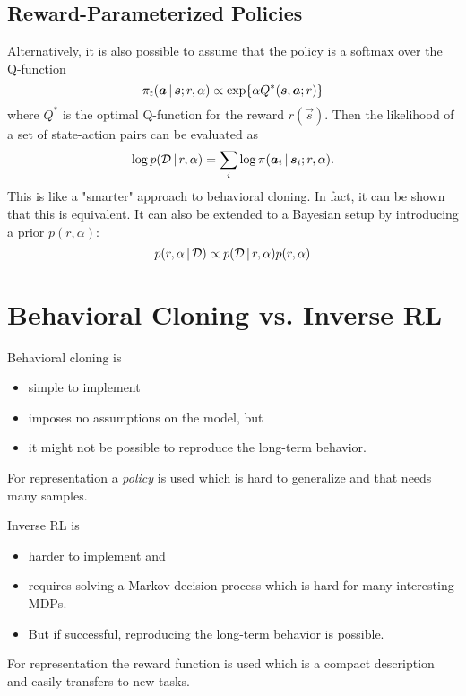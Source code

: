 		\subsection{Reward-Parameterized Policies}
			Alternatively, it is also possible to assume that the policy is a softmax over the Q-function
			\begin{equation*}
				\pi_t(\bm{a} \,\vert\, \bm{s}; r, \alpha) \propto \exp{ \alpha Q^\ast(\bm{s}, \bm{a}; r) }
			\end{equation*}
			where \(Q^\ast\) is the optimal Q-function for the reward \(r(\vec{s})\). Then the likelihood of a set of state-action pairs can be evaluated as
			\begin{equation*}
				\log p(\mathcal{D} \,\vert\, r, \alpha) = \sum_i \log \pi(\bm{a}_i \,\vert\, \bm{s}_i; r, \alpha).
			\end{equation*}
			This is like a "smarter" approach to behavioral cloning. In fact, it can be shown that this is equivalent. It can also be extended to a Bayesian setup by introducing a prior \( p(r, \alpha) \):
			\begin{equation*}
				p(r, \alpha \,\vert\, \mathcal{D}) \propto p(\mathcal{D} \,\vert\, r, \alpha) p(r, \alpha)
			\end{equation*}

	\section{Behavioral Cloning vs. Inverse RL}
		Behavioral cloning is
		\begin{itemize}
			\item simple to implement
			\item imposes no assumptions on the model, but
			\item it might not be possible to reproduce the long-term behavior.
		\end{itemize}
		For representation a \emph{policy} is used which is hard to generalize and that needs many samples.

		Inverse RL is
		\begin{itemize}
			\item harder to implement and
			\item requires solving a Markov decision process which is hard for many interesting MDPs.
			\item But if successful, reproducing the long-term behavior is possible.
		\end{itemize}
		For representation the reward function is used which is a compact description and easily transfers to new tasks.

